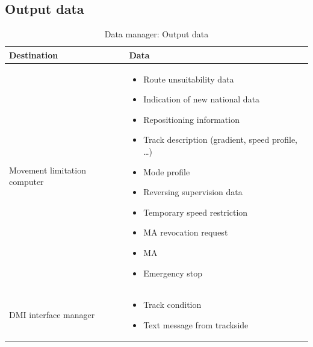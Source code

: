\documentclass[nocc]{template/openetcs_report}
\begin{document}
\subsection{Output data}
			\begin{longtable}{|l|l|}
				\caption{Data manager: Output data}\\ 
				\hline
				
					\begin{minipage}[t]{0.35\linewidth} \textbf{Destination}	\end{minipage} 
				&	\begin{minipage}[t]{0.65\linewidth} \textbf{Data} \end{minipage} \\
				
				\hline
																																									
					\begin{minipage}[t]{0.35\linewidth} Movement limitation computer	\end{minipage} 
				&	\begin{minipage}[t]{0.65\linewidth}
						\begin{itemize}
							\item Route unsuitability data
							\item Indication of new national data
							\item Repositioning information
							\item Track description (gradient, speed profile, …)
							\item Mode profile
							\item Reversing supervision data
							\item Temporary speed restriction
							\item MA revocation request
							\item MA
							\item Emergency stop						
						\end{itemize}
					\end{minipage} \\
				
				\hline
				
					\begin{minipage}[t]{0.35\linewidth} DMI interface manager	\end{minipage} 
				&	\begin{minipage}[t]{0.65\linewidth}
						\begin{itemize}
							\item Track condition
							\item Text message from trackside
						\end{itemize}			
					\end{minipage} \\
				

\end{longtable}
\end{document}
